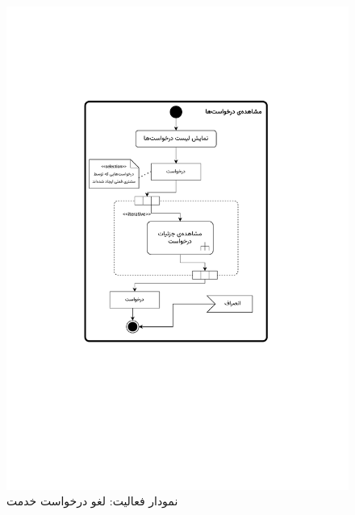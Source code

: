 \begin{figure}
	\centering
	\includegraphics[scale=0.8, page=7]{figs/OOD-activity11-20.pdf}
	\caption{نمودار فعالیت: لغو درخواست خدمت}
\end{figure}
\FloatBarrier
\newpage

